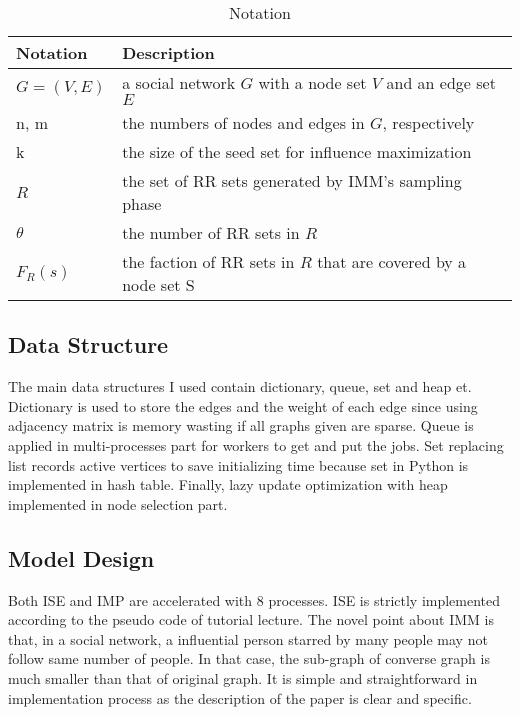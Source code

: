 \documentclass[conference,compsoc]{IEEEtran}
\begin{document}
\begin{table}[H]
\caption{Notation}
\centering\begin{tabular}{|>{\centering\arraybackslash}p{15mm}|p{65mm}|} 
	\hline
	\textbf{Notation} & \textbf{Description}\\
	\hline
	$G = (V,E)$ &  a social network $G$ with a node set $V$ and an edge set $E$\\ 
	\hline
	n, m & the numbers of nodes and edges in $G$, respectively \\
	\hline
	k & the size of the seed set for influence maximization \\ 
	\hline
	$R$ & the set of RR sets generated by IMM's sampling phase\\
	\hline
	$\theta$ & the number of RR sets in $R$ \\
	\hline
	$F_R(s)$ & the faction of RR sets in $R$ that are covered by a node set S\\
	\hline
\end{tabular}
\end{table}


\subsection{Data Structure} 
The main data structures I used contain dictionary, queue, set and heap et. Dictionary is used to store the edges and the weight of each edge since using adjacency matrix is memory wasting if all graphs given are sparse. Queue is applied in multi-processes part for workers to get and put the jobs. Set replacing list records active vertices to save initializing time because set in Python is implemented in hash table. Finally, lazy update optimization with heap implemented in node selection part. 
			


\subsection{Model Design}
Both ISE and IMP are accelerated with 8 processes. ISE is strictly implemented according to the pseudo code of tutorial lecture. The novel point about IMM is that, in a social network, a influential person starred by many people may not follow same number of people. In that case, the sub-graph of converse graph is much smaller than that of original graph. It is simple and straightforward in implementation process as the description of the paper \cite{IMM} is clear and specific.    
\end{document}
